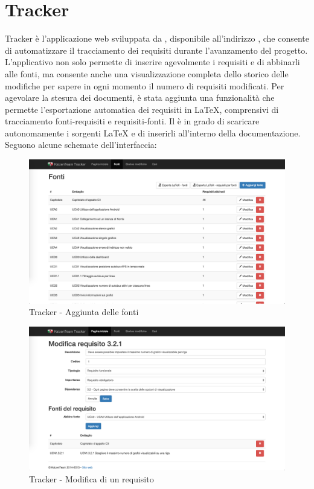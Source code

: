 \section{Tracker} \label{sec:tracker}

Tracker è l'applicazione web sviluppata da \groupname{}, disponibile all'indirizzo , che consente di automatizzare il tracciamento dei requisiti durante l’avanzamento del progetto. \\
L'applicativo non solo permette di inserire agevolmente i requisiti e di abbinarli alle fonti, ma consente anche una visualizzazione completa dello storico delle modifiche per sapere in ogni momento il numero di requisiti modificati. Per agevolare la stesura dei documenti, è stata aggiunta una funzionalità che permette l'esportazione automatica dei requisiti in \LaTeX{}, comprensivi di tracciamento fonti-requisiti e requisiti-fonti. Il  è in grado di scaricare autonomamente i sorgenti \LaTeX{} e di inserirli all'interno della documentazione. \\ Seguono alcune schemate dell'interfaccia:

\begin{figure}[H]
	\centering
	\includegraphics[width=\textwidth]{Pics/TrackerFonti}
	\caption{Tracker - Aggiunta delle fonti}
\end{figure}


\begin{figure}[H]
	\centering
	\includegraphics[width=\textwidth]{Pics/TrackerModificaRequisito}
	\caption{Tracker - Modifica di un requisito}
\end{figure}